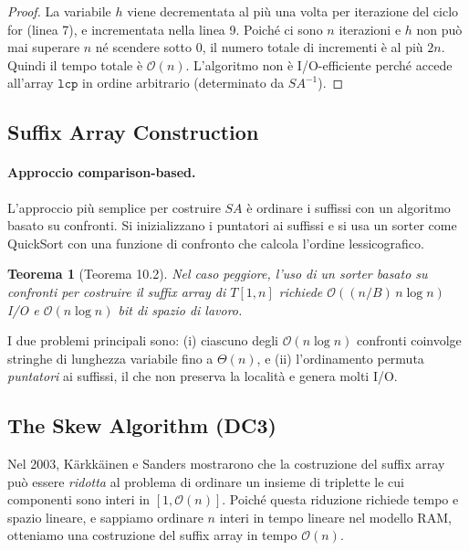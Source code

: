 \documentclass[12pt, a4paper, oneside]{book}
\theoremstyle{plain}
\newtheorem{teorema}{Teorema}[chapter]
\theoremstyle{definition}
\theoremstyle{remark}
\newcommand{\OO}[1]{\mathcal{O}\!\left(#1\right)}
\begin{document}
\begin{proof}
La variabile $h$ viene decrementata al più una volta per iterazione del ciclo for (linea 7), e incrementata nella linea 9. Poiché ci sono $n$ iterazioni e $h$ non può mai superare $n$ né scendere sotto $0$, il numero totale di incrementi è al più $2n$. Quindi il tempo totale è $\OO{n}$. L'algoritmo non è I/O-efficiente perché accede all'array $\mathtt{lcp}$ in ordine arbitrario (determinato da $SA^{-1}$).
\end{proof}

\subsection{Suffix Array Construction}
\label{subsec:sa-construction}

\paragraph{Approccio comparison-based.} L'approccio più semplice per costruire $SA$ è ordinare i suffissi con un algoritmo basato su confronti. Si inizializzano i puntatori ai suffissi e si usa un sorter come QuickSort con una funzione di confronto che calcola l'ordine lessicografico.

\begin{teorema}[Teorema 10.2]
\label{thm:sa-comparison}
Nel caso peggiore, l'uso di un sorter basato su confronti per costruire il suffix array di $T[1,n]$ richiede $\OO{(n/B)\,n\log n}$ I/O e $\OO{n\log n}$ bit di spazio di lavoro.
\end{teorema}

I due problemi principali sono: (i) ciascuno degli $\OO{n\log n}$ confronti coinvolge stringhe di lunghezza variabile fino a $\Theta(n)$, e (ii) l'ordinamento permuta \emph{puntatori} ai suffissi, il che non preserva la località e genera molti I/O.

\subsection{The Skew Algorithm (DC3)}
\label{subsec:dc3}

Nel 2003, Kärkkäinen e Sanders mostrarono che la costruzione del suffix array può essere \emph{ridotta} al problema di ordinare un insieme di triplette le cui componenti sono interi in $[1, \OO{n}]$. Poiché questa riduzione richiede tempo e spazio lineare, e sappiamo ordinare $n$ interi in tempo lineare nel modello RAM, otteniamo una costruzione del suffix array in tempo $\OO{n}$.
\end{document}
